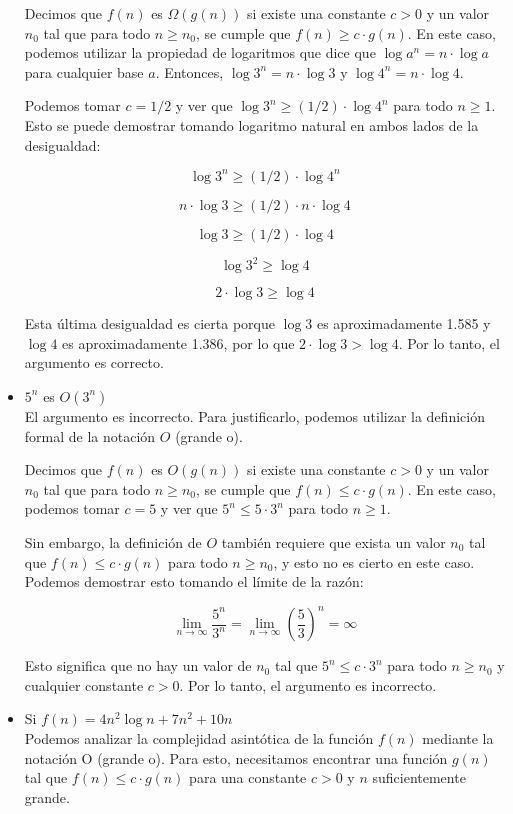 \begin{itemize}
	      Decimos que $f(n)$ es $\Omega(g(n))$ si existe una constante $c > 0$ y un valor $n_0$ tal que para todo $n \geq n_0$,
	      se cumple que $f(n) \geq c \cdot g(n)$. En este caso, podemos utilizar la propiedad de logaritmos que dice que $\log a^n = n \cdot \log a$
	      para cualquier base $a$. Entonces, $\log 3^n = n \cdot \log 3$ y $\log 4^n = n \cdot \log 4$.

	      Podemos tomar $c = 1/2$ y ver que $\log 3^n \geq (1/2) \cdot \log 4^n$ para todo $n \geq 1$.
	      Esto se puede demostrar tomando logaritmo natural en ambos lados de la desigualdad:

	      $$\log 3^n \geq (1/2) \cdot \log 4^n$$

	      $$n \cdot \log 3 \geq (1/2) \cdot n \cdot \log 4$$

	      $$\log 3 \geq (1/2) \cdot \log 4$$

	      $$\log 3^2 \geq \log 4$$

	      $$2 \cdot \log 3 \geq \log 4$$

	      Esta última desigualdad es cierta porque $\log 3$ es aproximadamente 1.585 y $\log 4$ es aproximadamente 1.386,
	      por lo que $2 \cdot \log 3 > \log 4$. Por lo tanto, el argumento es correcto.

	\item $5^n$ es $O (3^n)$\\
	      El argumento es incorrecto. Para justificarlo, podemos utilizar la definición formal de la notación $O$ (grande o).

	      Decimos que $f(n)$ es $O(g(n))$ si existe una constante $c > 0$ y un valor $n_0$ tal que para todo $n \geq n_0$,
	      se cumple que $f(n) \leq c \cdot g(n)$. En este caso, podemos tomar $c = 5$ y ver que $5^n \leq 5 \cdot 3^n$ para todo $n \geq 1$.

	      Sin embargo, la definición de $O$ también requiere que exista un valor $n_0$ tal que $f(n) \leq c \cdot g(n)$ para todo $n \geq n_0$,
	      y esto no es cierto en este caso. Podemos demostrar esto tomando el límite de la razón:

	      $$\lim_{n \rightarrow \infty} \frac{5^n}{3^n} = \lim_{n \rightarrow \infty} \left(\frac{5}{3}\right)^n = \infty$$

	      Esto significa que no hay un valor de $n_0$ tal que $5^n \leq c \cdot 3^n$ para todo $n \geq n_0$ y cualquier constante $c > 0$.
	      Por lo tanto, el argumento es incorrecto.

	\item Si $f(n) = 4 n^2 \log n + 7n^2 + 10n$\\
	      Podemos analizar la complejidad asintótica de la función $f(n)$ mediante la notación O (grande o).
	      Para esto, necesitamos encontrar una función $g(n)$ tal que $f(n) \leq c \cdot g(n)$ para una constante $c > 0$ y $n$ suficientemente grande.


\end{itemize}
